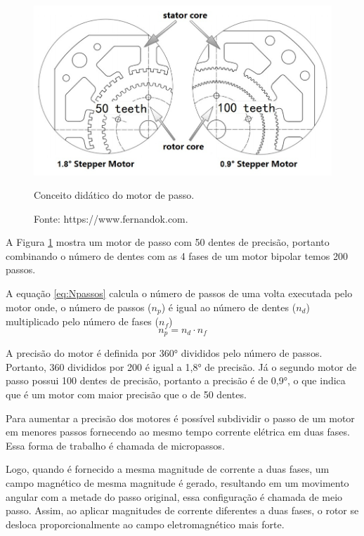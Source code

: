 \begin{figure}[H]
\centering
\includegraphics[scale = 0.4]{figuras/didaticopasso}
\caption{Conceito didático do motor de passo.}
\caption*{Fonte: https://www.fernandok.com.}
\label{fig:didaticopasso}
\end{figure}
    
A Figura \ref{fig:didaticopasso} mostra um motor de passo com 50 dentes de precisão, portanto combinando 
o número de dentes com as 4 fases de um motor bipolar temos 200 passos. 

A equação \ref{eq:Npassos} calcula o número de passos de uma volta executada pelo motor onde,
o número de passos ($n_{p}$) é igual ao número de dentes ($n_{d}$) multiplicado pelo número de fases ($n_{f}$)
\begin{equation}\label{eq:Npassos}
    n_{p} = n_{d} \cdot n_{f}
\end{equation}

A precisão do motor é definida por 360° divididos pelo número de passos. Portanto, 
360 divididos por 200 é igual a 1,8° de precisão. Já o segundo motor 
de passo possui 100 dentes de precisão, portanto a precisão é de 0,9°, o que indica que 
é um motor com maior precisão que o de 50 dentes.

Para aumentar a precisão dos motores é possível subdividir o passo de um motor em menores passos fornecendo 
ao mesmo tempo corrente elétrica em duas fases. Essa forma de trabalho é chamada de micropassos.

Logo, quando é fornecido a mesma magnitude de corrente a duas fases, um campo magnético de mesma magnitude 
é gerado, resultando em um movimento angular com a metade do passo original, essa configuração é chamada de 
meio passo. Assim, ao aplicar magnitudes de corrente diferentes a duas fases, o rotor se desloca 
proporcionalmente ao campo eletromagnético mais forte.

